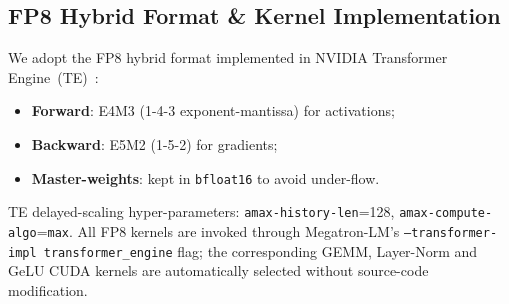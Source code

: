 \subsection{FP8 Hybrid Format \& Kernel Implementation}
\label{sec:fp8-detail}

We adopt the FP8 hybrid format implemented in NVIDIA Transformer Engine~(TE)~\cite{nvidia-transformer-engine}:
\begin{itemize}[leftmargin=*,nosep]
  \item \textbf{Forward}: E4M3 (1-4-3 exponent-mantissa) for activations;
  \item \textbf{Backward}: E5M2 (1-5-2) for gradients;
  \item \textbf{Master-weights}: kept in \texttt{bfloat16} to avoid under-flow.
\end{itemize}
TE delayed-scaling hyper-parameters: \texttt{amax-history-len}=128, \texttt{amax-compute-algo}=\texttt{max}.  
All FP8 kernels are invoked through Megatron-LM's \texttt{--transformer-impl transformer\_engine} flag;  
the corresponding GEMM, Layer-Norm and GeLU CUDA kernels are automatically selected without source-code modification. 